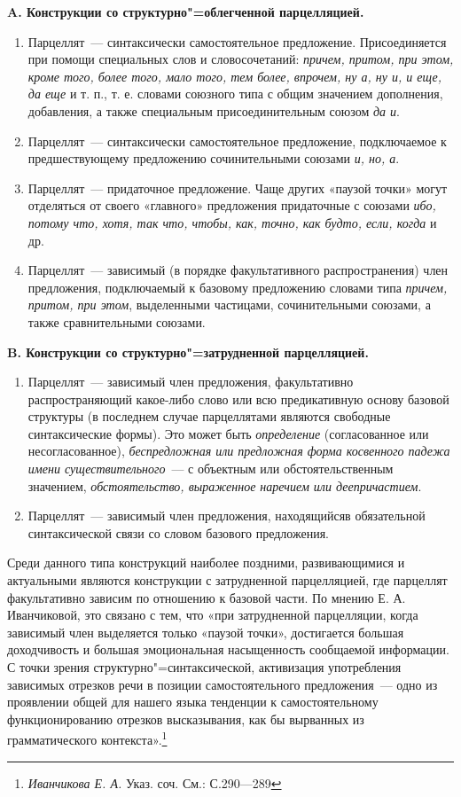 \documentclass{kursa4}
\begin{document}
      {\centering
      \textbf{A. Конструкции со структурно"=облегченной парцелляцией.}}
      \begin{enumerate}
        \item Парцеллят~--- синтаксически самостоятельное предложение. Присоединяется при помощи специальных слов и словосочетаний: \textit{причем, притом, при этом, кроме того, более того, мало того, тем более, впрочем, ну а, ну и, и еще, да еще} и т. п., т. е. словами союзного типа с общим значением дополнения, добавления, а также специальным присоединительным союзом \textit{да и}. \item Парцеллят~--- синтаксически самостоятельное предложение, подключаемое к предшествующему предложению сочинительными союзами \textit{и, но, а}. \item Парцеллят~--- придаточное предложение. Чаще других «паузой точки» могут отделяться от своего «главного» предложения придаточные с союзами \textit{ибо, потому что, хотя, так что, чтобы, как, точно, как будто, если, когда}
        и др. \item Парцеллят~--- зависимый (в порядке факультативного распространения) член предложения, подключаемый к базовому предложению словами типа \textit{причем, притом, при этом}, выделенными частицами, сочинительными союзами, а также сравнительными союзами. \end{enumerate}

      {\centering\textbf{B. Конструкции со структурно"=затрудненной парцелляцией.}}
      \begin{enumerate}
        \item {Парцеллят~--- зависимый член предложения, факультативно распространяющий какое-либо слово или всю предикативную основу базовой структуры (в последнем случае парцеллятами являются свободные синтаксические формы). Это может быть
        }\textit{определение}
        (согласованное или несогласованное), \textit{беспредложная или предложная форма косвенного падежа имени существительного}~--- с объектным или обстоятельственным значением, \textit{обстоятельство, выраженное наречием или деепричастием}. \item {Парцеллят~--- зависимый член предложения, находящийся}в обязательной синтаксической связи со словом базового предложения. \end{enumerate}

      Среди данного типа конструкций наиболее поздними, развивающимися и актуальными являются конструкции с затрудненной парцелляцией, где парцеллят факультативно зависим по отношению к базовой части. По мнению Е. А. Иванчиковой, это связано с тем, что «при затрудненной парцелляции, когда зависимый член выделяется только «паузой точки», достигается большая доходчивость и большая эмоциональная насыщенность сообщаемой информации. С точки зрения структурно"=синтаксической, активизация употребления зависимых отрезков речи в позиции самостоятельного предложения~--- одно из проявлении общей для нашего языка тенденции к самостоятельному функционированию отрезков высказывания, как бы вырванных из грамматического контекста».\footnote{\textit{ Иванчикова Е. А. }{Указ. соч. См.: С.290—289}}
\end{document}
